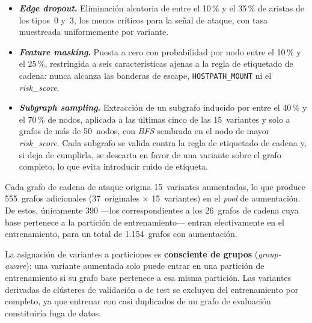 \begin{itemize}
  \item \textbf{\textit{Edge dropout}.} Eliminación aleatoria de entre el 10\,\%
    y el 35\,\% de aristas de los tipos~0 y~3, los menos críticos para la señal de
    ataque, con tasa muestreada uniformemente por variante.

  \item \textbf{\textit{Feature masking}.} Puesta a cero con probabilidad por
    nodo entre el 10\,\% y el 25\,\%, restringida a seis características ajenas a
    la regla de etiquetado de cadena: nunca alcanza las banderas de escape,
    \texttt{HOSTPATH\_MOUNT} ni el \textit{risk\_score}.

  \item \textbf{\textit{Subgraph sampling}.} Extracción de un subgrafo inducido
    por entre el 40\,\% y el 70\,\% de nodos, aplicada a las últimas cinco de las
    15~variantes y solo a grafos de más de 50~nodos, con \textit{BFS} sembrada en
    el nodo de mayor \textit{risk\_score}. Cada subgrafo se valida contra la regla
    de etiquetado de cadena y, si deja de cumplirla, se descarta en favor de una
    variante sobre el grafo completo, lo que evita introducir ruido de etiqueta.
\end{itemize}

Cada grafo de cadena de ataque origina 15~variantes aumentadas, lo que produce
555~grafos adicionales (37~originales \(\times\) 15~variantes) en el
\textit{pool} de aumentación. De estos, únicamente 390 —los correspondientes a
los 26~grafos de cadena cuya base pertenece a la partición de entrenamiento—
entran efectivamente en el entrenamiento, para un total de 1.154~grafos con
aumentación.

La asignación de variantes a particiones es \textbf{consciente de grupos}
(\textit{group-aware}): una variante aumentada solo puede entrar en una partición
de entrenamiento si su grafo base pertenece a esa misma partición. Las variantes
derivadas de clústeres de validación o de test se excluyen del entrenamiento por
completo, ya que entrenar con casi duplicados de un grafo de evaluación
constituiría fuga de datos.

